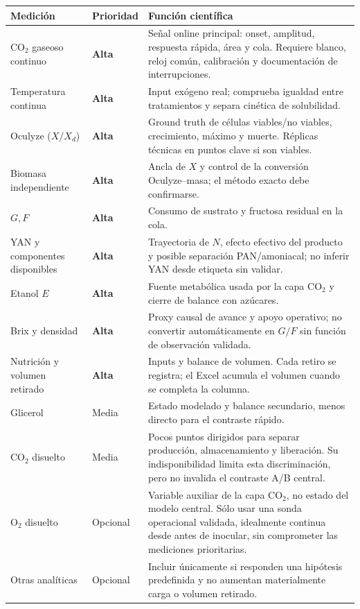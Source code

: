 \documentclass[11pt,a4paper]{article}
\newcommand{\alta}{\textbf{Alta}}
\newcommand{\media}{Media}
\newcommand{\opcional}{Opcional}
\begin{document}
\begin{longtable}{@{}p{}p{}p{}@{}}
\toprule
Medición & Prioridad & Función científica\\
\midrule
\endhead
CO$_2$ gaseoso continuo & \alta & Señal online principal: onset, amplitud,
respuesta rápida, área y cola. Requiere blanco, reloj común, calibración y
documentación de interrupciones.\\
Temperatura continua & \alta & Input exógeno real; comprueba igualdad entre
tratamientos y separa cinética de solubilidad.\\
Oculyze (\(X/X_d\)) & \alta & Ground truth de células viables/no viables,
crecimiento, máximo y muerte. Réplicas técnicas en puntos clave si son viables.\\
Biomasa independiente & \alta & Ancla de \(X\) y control de la conversión
Oculyze--masa; el método exacto debe confirmarse.\\
\(G,F\) & \alta & Consumo de sustrato y fructosa residual en la cola.\\
YAN y componentes disponibles & \alta & Trayectoria de \(N\), efecto efectivo
del producto y posible separación PAN/amoniacal; no inferir YAN desde etiqueta
sin validar.\\
Etanol \(E\) & \alta & Fuente metabólica usada por la capa CO$_2$ y cierre de
balance con azúcares.\\
Brix y densidad & \alta & Proxy causal de avance y apoyo operativo; no convertir
automáticamente en \(G/F\) sin función de observación validada.\\
Nutrición y volumen retirado & \alta & Inputs y balance de volumen. Cada retiro
se registra; el Excel acumula el volumen cuando se completa la columna.\\
Glicerol & \media & Estado modelado y balance secundario, menos directo para el
contraste rápido.\\
CO$_2$ disuelto & \media & Pocos puntos dirigidos para separar producción,
almacenamiento y liberación. Su indisponibilidad limita esta discriminación,
pero no invalida el contraste A/B central.\\
O$_2$ disuelto & \opcional & Variable auxiliar de la capa CO$_2$, no estado del
modelo central. Sólo usar una sonda operacional validada, idealmente continua
desde antes de inocular, sin comprometer las mediciones prioritarias.\\
Otras analíticas & \opcional & Incluir únicamente si responden una hipótesis
predefinida y no aumentan materialmente carga o volumen retirado.\\
\bottomrule
\end{longtable}
\end{document}
